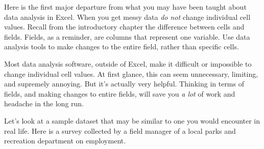\documentclass[
]{book}
\newenvironment{Shaded}{\begin{snugshade}}{\end{snugshade}}
\newcommand{\DataTypeTok}[1]{\textcolor[rgb]{0.13,0.29,0.53}{#1}}
\newcommand{\KeywordTok}[1]{\textcolor[rgb]{0.13,0.29,0.53}{\textbf{#1}}}
\newcommand{\NormalTok}[1]{#1}
\newcommand{\OperatorTok}[1]{\textcolor[rgb]{0.81,0.36,0.00}{\textbf{#1}}}
\newcommand{\OtherTok}[1]{\textcolor[rgb]{0.56,0.35,0.01}{#1}}
\newcommand{\StringTok}[1]{\textcolor[rgb]{0.31,0.60,0.02}{#1}}
\begin{document}
Here is the first major departure from what you may have been taught about data analysis in Excel. When you get messy data \emph{do not} change individual cell values. Recall from the introductory chapter the difference between cells and fields. Fields, as a reminder, are columns that represent one variable. Use data analysis tools to make changes to the entire field, rather than specific cells.

Most data analysis software, outside of Excel, make it difficult or impossible to change individual cell values. At first glance, this can seem unnecessary, limiting, and supremely annoying. But it's actually very helpful. Thinking in terms of fields, and making changes to entire fields, will save you \emph{a lot} of work and headache in the long run.

Let's look at a sample dataset that may be similar to one you would encounter in real life. Here is a survey collected by a field manager of a local parks and recreation department on employment.

\begin{Shaded}
\end{Shaded}
\end{document}
